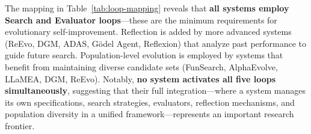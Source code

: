 \begin{table}[htbp]
\centering
{}
\caption{Mapping to the Five Evolution Loops framework. All systems employ Search and Evaluator loops; advanced systems add Reflection. Population-level evolution (maintaining diverse candidate sets) is used by approximately half the systems. No system activates all five loops simultaneously---their integration represents a research frontier.}
\label{tab:loop-mapping}
\end{table}

The mapping in Table~\ref{tab:loop-mapping} reveals that \textbf{all systems employ Search and Evaluator loops}---these are the minimum requirements for evolutionary self-improvement. Reflection is added by more advanced systems (ReEvo, DGM, ADAS, G\"{o}del Agent, Reflexion) that analyze past performance to guide future search. Population-level evolution is employed by systems that benefit from maintaining diverse candidate sets (FunSearch, AlphaEvolve, LLaMEA, DGM, ReEvo). Notably, \textbf{no system activates all five loops simultaneously}, suggesting that their full integration---where a system manages its own specifications, search strategies, evaluators, reflection mechanisms, and population diversity in a unified framework---represents an important research frontier.


